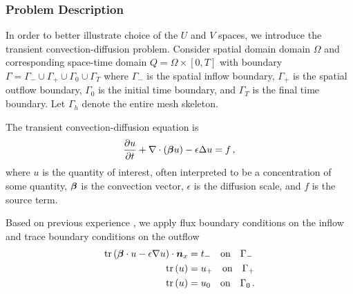 \documentclass{article}
\begin{document}
\subsubsection{Problem Description}
In order to better illustrate choice of the $U$ and $V$ spaces, we introduce the transient convection-diffusion problem.
Consider spatial domain domain $\Omega$ and corresponding space-time domain $Q=\Omega\times[0,T]$ 
with boundary $\Gamma=\Gamma_-\cup\Gamma_+\cup\Gamma_0\cup\Gamma_T$ 
where $\Gamma_-$ is the spatial inflow boundary, $\Gamma_+$ is the spatial outflow boundary, $\Gamma_0$ is the initial time boundary, 
and $\Gamma_T$ is the final time boundary. Let $\Gamma_h$ denote the entire mesh skeleton.

The transient convection-diffusion equation is
\begin{equation*}
\frac{\partial u}{\partial t}+\nabla\cdot(\boldsymbol\beta u)-\epsilon\Delta u=f\,,
\end{equation*}
where $u$ is the quantity of interest, often interpreted to be a concentration of some quantity, $\boldsymbol\beta$ is the convection vector,
$\epsilon$ is the  diffusion scale, and $f$ is the source term.

Based on previous experience \cite{?}, we apply flux boundary conditions on the inflow 
and trace boundary conditions on the outflow
\begin{align*}
\operatorname*{tr}\left( \boldsymbol\beta\cdot u-\epsilon\nabla u \right)\cdot\boldsymbol n_x&=t_-\quad\text{on}\quad\Gamma_-\\
\operatorname*{tr}\left( u \right)&=u_+\quad\text{on}\quad\Gamma_+\\
\operatorname*{tr}\left( u \right)&=u_0\quad\text{on}\quad\Gamma_0\,.
\end{align*}
\end{document}
